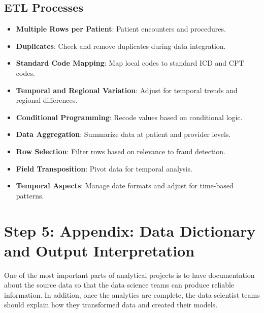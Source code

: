 \documentclass{article}
\begin{document}
\subsection*{ETL Processes}
\begin{itemize}
    \item \textbf{Multiple Rows per Patient}: Patient encounters and procedures.
    \item \textbf{Duplicates}: Check and remove duplicates during data integration.
    \item \textbf{Standard Code Mapping}: Map local codes to standard ICD and CPT codes.
    \item \textbf{Temporal and Regional Variation}: Adjust for temporal trends and regional differences.
    \item \textbf{Conditional Programming}: Recode values based on conditional logic.
    \item \textbf{Data Aggregation}: Summarize data at patient and provider levels.
    \item \textbf{Row Selection}: Filter rows based on relevance to fraud detection.
    \item \textbf{Field Transposition}: Pivot data for temporal analysis.
    \item \textbf{Temporal Aspects}: Manage date formats and adjust for time-based patterns.
\end{itemize}

\section*{Step 5: Appendix: Data Dictionary and Output Interpretation}

One of the most important parts of analytical projects is to have documentation about the source data so that the data science teams can produce reliable information. In addition, once the analytics are complete, the data scientist teams should explain how they transformed data and created their models.
\end{document}
